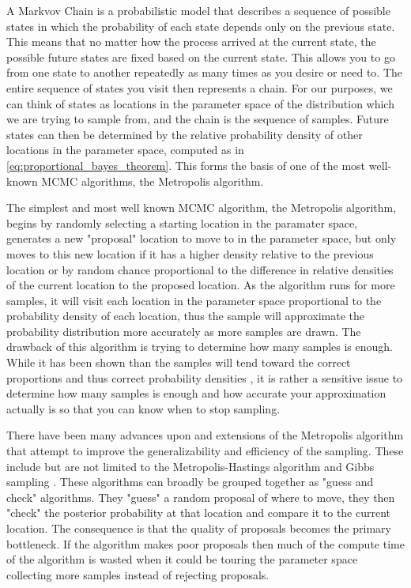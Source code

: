 A Markvov Chain is a probabilistic model that describes a sequence of possible states in which the probability of each state depends only on the previous state. This means that no matter how the process arrived at the current state, the possible future states are fixed based on the current state. This allows you to go from one state to another repeatedly as many times as you desire or need to. The entire sequence of states you visit then represents a chain. For our purposes, we can think of states as locations in the parameter space of the distribution which we are trying to sample from, and the chain is the sequence of samples. Future states can then be determined by the relative probability density of other locations in the parameter space, computed as in \ref{eq:proportional_bayes_theorem}. This forms the basis of one of the most well-known MCMC algorithms, the Metropolis algorithm.

The simplest and most well known MCMC algorithm, the Metropolis algorithm, begins by randomly selecting a starting location in the paramater space, generates a new "proposal" location to move to in the parameter space, but only moves to this new location if it has a higher density relative to the previous location or by random chance proportional to the difference in relative densities of the current location to the proposed location. As the algorithm runs for more samples, it will visit each location in the parameter space proportional to the probability density of each location, thus the sample will approximate the probability distribution more accurately as more samples are drawn. The drawback of this algorithm is trying to determine how many samples is enough. While it has been shown than the samples will tend toward the correct proportions and thus correct probability densities \cite{Metropolis1953} \cite{Hastings1970}, it is rather a sensitive issue to determine how many samples is enough and how accurate your approximation actually is so that you can know when to stop sampling.

There have been many advances upon and extensions of the Metropolis algorithm that attempt to improve the generalizability and efficiency of the sampling. These include but are not limited to the Metropolis-Hastings algorithm and Gibbs sampling \cite{Hastings1970} \cite{German1984}. These algorithms can broadly be grouped together as "guess and check" algorithms. They "guess" a random proposal of where to move, they then "check" the posterior probability at that location and compare it to the current location. The consequence is that the quality of proposals becomes the primary bottleneck. If the algorithm makes poor proposals then much of the compute time of the algorithm is wasted when it could be touring the parameter space collecting more samples instead of rejecting proposals.

